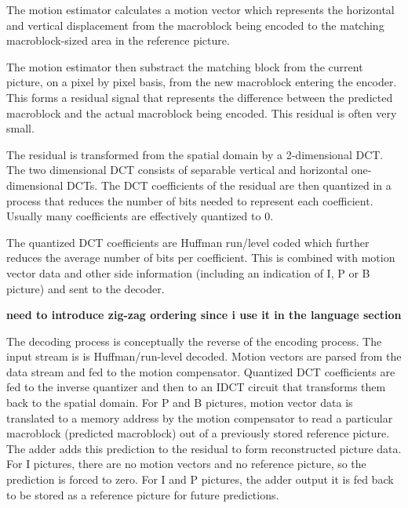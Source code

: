 The motion estimator calculates a
motion vector which represents the horizontal and vertical
displacement from the macroblock being encoded to the matching
macroblock-sized area in the reference picture.

The motion estimator then substract the matching block from the
current picture, on a pixel by pixel basis, from
the new macroblock entering the encoder. This forms a
residual signal that represents the difference between the
predicted macroblock and the actual macroblock being encoded. This
residual is often very small.

The residual is transformed from the spatial domain by a 2-dimensional
DCT.  The two dimensional DCT consists of separable vertical and
horizontal one-dimensional DCTs. The DCT coefficients of the residual
are then quantized in a process that reduces the number of bits needed
to represent each coefficient. Usually many coefficients are
effectively quantized to 0.

The quantized DCT coefficients are Huffman run/level coded which
further reduces the average number of bits per coefficient. This is
combined with motion vector data and other side information (including
an indication of I, P or B picture) and sent to the decoder.

{\bf need to introduce zig-zag ordering since i use it in the language
  section}


The decoding process is conceptually the reverse of the encoding
process. The input stream is is Huffman/run-level decoded. Motion vectors
are parsed from the data stream and fed to the motion
compensator. Quantized DCT coefficients are fed to the inverse
quantizer and then to an IDCT circuit that transforms them back to the
spatial domain. For P and B pictures, motion vector data is translated
to a memory address  by the motion compensator to read a particular
macroblock (predicted macroblock) out of a previously stored reference
picture. The adder adds this prediction  to the residual to form
reconstructed picture data. For I pictures, there are no motion
vectors and no reference picture, so the prediction is forced to
zero. For I and P pictures, the adder output it is fed back to be
stored as a reference picture for future predictions.

